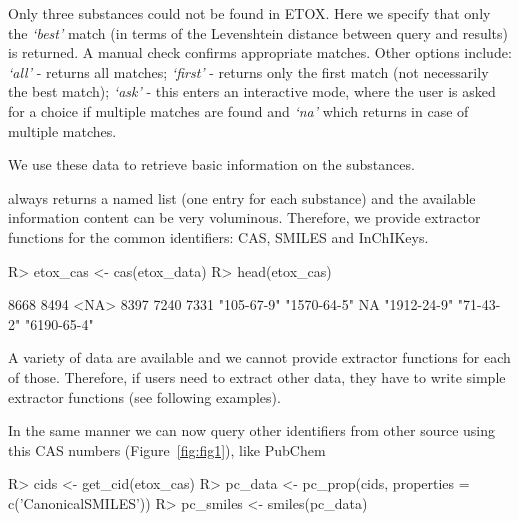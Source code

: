 \documentclass[article, shortnames]{jss}\usepackage[]{graphicx}\usepackage[]{color}
\begin{document}
Only three substances could not be found in ETOX. 
Here we specify that only the \emph{`best'} match (in terms of the Levenshtein distance between query and results) is returned. 
A manual check confirms appropriate matches. 
Other options include: \emph{`all'} - returns all matches; \emph{`first'} - returns only the first match (not necessarily the best match); \emph{`ask'} - this enters an interactive mode, where the user is asked for a choice if multiple matches are found and \emph{`na'} which returns  in case of multiple matches.

We use these data to retrieve basic information on the substances.

\begin{CodeChunk}
\end{CodeChunk}

 always returns a named list (one entry for each substance) and the available information content can be very voluminous.
Therefore, we provide extractor functions for the common identifiers: CAS, SMILES and InChIKeys.
\begin{CodeChunk}
\begin{CodeInput}
R> etox_cas <- cas(etox_data)
R> head(etox_cas)
\end{CodeInput}
\begin{CodeOutput}
       8668        8494        <NA>        8397        7240        7331 
 "105-67-9" "1570-64-5"          NA "1912-24-9"   "71-43-2" "6190-65-4" 
\end{CodeOutput}
\end{CodeChunk}

A variety of data are available and we cannot provide extractor functions for each of those.
Therefore, if users need to extract other data, they have to write simple extractor functions (see following examples).

In the same manner we can now query other identifiers from other source using this CAS numbers (Figure~\ref{fig:fig1}), like PubChem
\begin{CodeChunk}
\end{CodeChunk}

\begin{CodeChunk}
\begin{CodeInput}
R> cids <- get_cid(etox_cas)
R> pc_data <- pc_prop(cids, properties = c('CanonicalSMILES'))
R> pc_smiles <- smiles(pc_data)
\end{CodeInput}
\end{CodeChunk}
\end{document}
